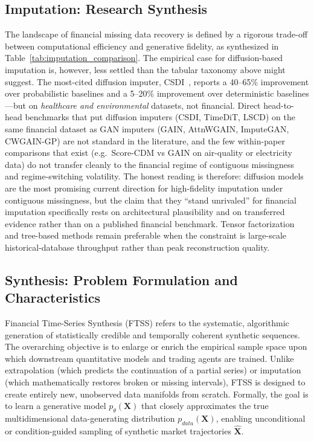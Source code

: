 \documentclass[11pt,a4paper]{article}
\begin{document}
\subsection{Imputation: Research Synthesis}

The landscape of financial missing data recovery is defined by a rigorous trade-off between computational efficiency and generative fidelity, as synthesized in Table~\ref{tab:imputation_comparison}. The empirical case for diffusion-based imputation is, however, less settled than the tabular taxonomy above might suggest. The most-cited diffusion imputer, CSDI~\citep{tashiro2021csdi}, reports a 40--65\% improvement over probabilistic baselines and a 5--20\% improvement over deterministic baselines---but on \emph{healthcare and environmental} datasets, not financial. Direct head-to-head benchmarks that put diffusion imputers (CSDI, TimeDiT, LSCD) on the same financial dataset as GAN imputers (GAIN, AttnWGAIN, ImputeGAN, CWGAIN-GP) are not standard in the literature, and the few within-paper comparisons that exist (e.g.\ Score-CDM vs GAIN on air-quality or electricity data) do not transfer cleanly to the financial regime of contiguous missingness and regime-switching volatility. The honest reading is therefore: diffusion models are the most promising current direction for high-fidelity imputation under contiguous missingness, but the claim that they ``stand unrivaled'' for financial imputation specifically rests on architectural plausibility and on transferred evidence rather than on a published financial benchmark. Tensor factorization and tree-based methods remain preferable when the constraint is large-scale historical-database throughput rather than peak reconstruction quality.

\subsection{Synthesis: Problem Formulation and Characteristics}
\label{sec:synthesis}

Financial Time-Series Synthesis (FTSS) refers to the systematic, algorithmic generation of statistically credible and temporally coherent synthetic sequences. The overarching objective is to enlarge or enrich the empirical sample space upon which downstream quantitative models and trading agents are trained. Unlike extrapolation (which predicts the continuation of a partial series) or imputation (which mathematically restores broken or missing intervals), FTSS is designed to create entirely new, unobserved data manifolds from scratch. Formally, the goal is to learn a generative model $p_\theta(\mathbf{X})$ that closely approximates the true multidimensional data-generating distribution $p_{data}(\mathbf{X})$, enabling unconditional or condition-guided sampling of synthetic market trajectories $\hat{\mathbf{X}}$.
\end{document}
